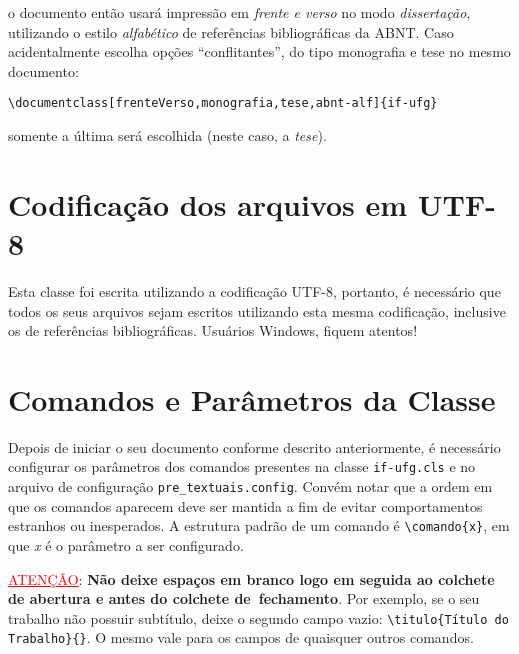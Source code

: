 \noindent
o documento então usará impressão em \emph{frente e verso} no modo \emph{dissertação}, utilizando o estilo \emph{alfabético} de referências bibliográficas da ABNT. Caso acidentalmente escolha opções ``conflitantes'', do tipo monografia e tese no mesmo documento:

\begin{lstlisting}[style=lista]
\documentclass[frenteVerso,monografia,tese,abnt-alf]{if-ufg}
\end{lstlisting}

\noindent
somente a última será escolhida (neste caso, a \emph{tese}).

\section{Codificação dos arquivos em UTF-8}

Esta classe foi escrita utilizando a codificação UTF-8, portanto, é necessário que todos os seus arquivos sejam escritos utilizando esta mesma codificação, inclusive os de referências bibliográficas. Usuários Windows, fiquem atentos!

\section{Comandos e Parâmetros da Classe}

Depois de iniciar o seu documento conforme descrito anteriormente, é necessário configurar os parâmetros dos comandos presentes na classe \texttt{if-ufg.cls} e no arquivo de configuração \texttt{pre\_textuais.config}. Convém notar que a ordem em que os comandos aparecem deve ser mantida a fim de evitar comportamentos estranhos ou inesperados. A estrutura padrão de um comando é \verb$\comando{x}$, em que \emph{x} é o parâmetro a ser configurado. 

\vspace{20pt}
\noindent
\textcolor{red}{\uline{ATENÇÃO}}: \textbf{Não deixe espaços em branco logo em seguida ao colchete de abertura e antes do colchete \mbox{de fechamento}}. Por exemplo, se o seu trabalho não possuir subtítulo, deixe o segundo campo vazio: \Verb+\titulo{Título do Trabalho}{}+. O mesmo vale para os campos de quaisquer outros comandos.
\vspace{20pt}

